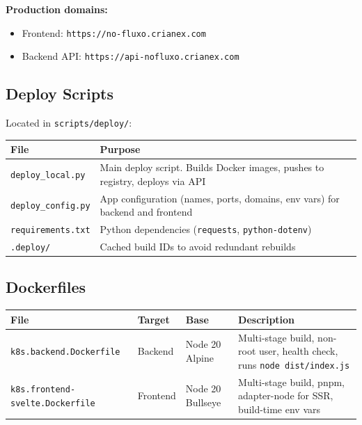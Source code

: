 \documentclass[11pt,a4paper]{article}
\newcommand{\code}[1]{\texttt{#1}}
\begin{document}
\noindent\textbf{Production domains:}
\begin{itemize}[noitemsep]
    \item Frontend: \code{https://no-fluxo.crianex.com}
    \item Backend API: \code{https://api-nofluxo.crianex.com}
\end{itemize}

\subsection{Deploy Scripts}

Located in \code{scripts/deploy/}:

\begin{center}
\begin{longtable}{@{}L{3.5cm}L{9cm}@{}}
\toprule
\textbf{File} & \textbf{Purpose} \\
\midrule
\endhead
\code{deploy\_local.py}  & Main deploy script. Builds Docker images, pushes to registry, deploys via API \\
\code{deploy\_config.py} & App configuration (names, ports, domains, env vars) for backend and frontend \\
\code{requirements.txt} & Python dependencies (\code{requests}, \code{python-dotenv}) \\
\code{.deploy/}         & Cached build IDs to avoid redundant rebuilds \\
\bottomrule
\end{longtable}
\end{center}

\subsection{Dockerfiles}

\begin{center}
\begin{longtable}{@{}L{3.8cm}L{1.8cm}L{2.5cm}L{4.5cm}@{}}
\toprule
\textbf{File} & \textbf{Target} & \textbf{Base} & \textbf{Description} \\
\midrule
\endhead
\code{k8s.backend.Dockerfile}         & Backend  & Node 20 Alpine   & Multi-stage build, non-root user, health check, runs \code{node dist/index.js} \\
\code{k8s.frontend-svelte.Dockerfile} & Frontend & Node 20 Bullseye & Multi-stage build, pnpm, adapter-node for SSR, build-time env vars \\
\bottomrule
\end{longtable}
\end{center}
\end{document}
